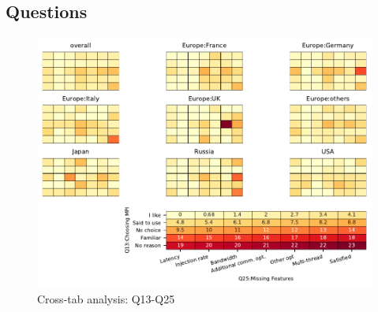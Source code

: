 
\subsection{Questions}


\begin{figure}
\begin{center}
\includegraphics[width=12cm]{../pdfs/Q13-Q25.pdf}
\caption{Cross-tab analysis: Q13-Q25}
\label{fig:Q13-Q25}
\end{center}
\end{figure}
